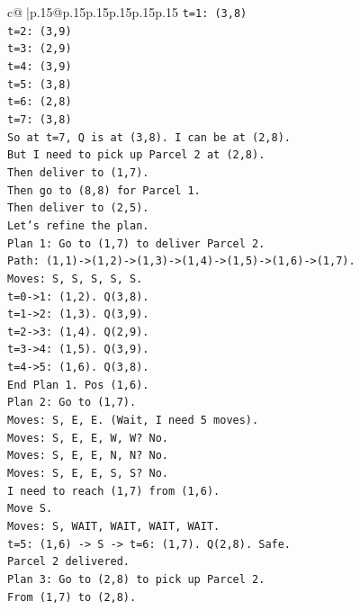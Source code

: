 \documentclass{article}
\begin{document}
{\begin{supertabular}{c@{$\;$}|p{.15\linewidth}@{}p{.15\linewidth}p{.15\linewidth}p{.15\linewidth}p{.15\linewidth}p{.15\linewidth}}
{{{\texttt{t=1: (3,8)} \\
\texttt{t=2: (3,9)} \\
\texttt{t=3: (2,9)} \\
\texttt{t=4: (3,9)} \\
\texttt{t=5: (3,8)} \\
\texttt{t=6: (2,8)} \\
\texttt{t=7: (3,8)} \\
\texttt{So at t=7, Q is at (3,8). I can be at (2,8).} \\
\texttt{But I need to pick up Parcel 2 at (2,8).} \\
\texttt{Then deliver to (1,7).} \\
\texttt{Then go to (8,8) for Parcel 1.} \\
\texttt{Then deliver to (2,5).} \\
\texttt{Let's refine the plan.} \\
\texttt{Plan 1: Go to (1,7) to deliver Parcel 2.} \\
\texttt{Path: (1,1){-}>(1,2){-}>(1,3){-}>(1,4){-}>(1,5){-}>(1,6){-}>(1,7).} \\
\texttt{Moves: S, S, S, S, S.} \\
\texttt{t=0{-}>1: (1,2). Q(3,8).} \\
\texttt{t=1{-}>2: (1,3). Q(3,9).} \\
\texttt{t=2{-}>3: (1,4). Q(2,9).} \\
\texttt{t=3{-}>4: (1,5). Q(3,9).} \\
\texttt{t=4{-}>5: (1,6). Q(3,8).} \\
\texttt{End Plan 1. Pos (1,6).} \\
\texttt{Plan 2: Go to (1,7).} \\
\texttt{Moves: S, E, E. (Wait, I need 5 moves).} \\
\texttt{Moves: S, E, E, W, W? No.} \\
\texttt{Moves: S, E, E, N, N? No.} \\
\texttt{Moves: S, E, E, S, S? No.} \\
\texttt{I need to reach (1,7) from (1,6).} \\
\texttt{Move S.} \\
\texttt{Moves: S, WAIT, WAIT, WAIT, WAIT.} \\
\texttt{t=5: (1,6) {-}> S {-}> t=6: (1,7). Q(2,8). Safe.} \\
\texttt{Parcel 2 delivered.} \\
\texttt{Plan 3: Go to (2,8) to pick up Parcel 2.} \\
\texttt{From (1,7) to (2,8).} \\
}}}
\end{supertabular}}
\end{document}
